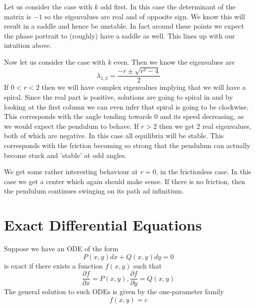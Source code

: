 Let us consider the case with $k$ odd first. In this case the determinant of the matrix is $-1$ so the eigenvalues are real and of opposite sign. We know this will result in a saddle and hence be unstable. In fact around these points we expect the phase portrait to (roughly) have a saddle as well. This lines up with our intuition above.

Now let us consider the case with $k$ even. Then we know the eigenvalues are
$$ \lambda_{1, 2} = \frac{-r \pm \sqrt{r^2 - 4}}{2} $$
If $0 < r < 2$ then we will have complex eigenvalues implying that we will have a spiral. Since the real part is positive, solutions are going to spiral in and by looking at the first column we can even infer that spiral is going to be clockwise. This corresponds with the angle tending towards 0 and its speed decreasing, as we would expect the pendulum to behave. If $r > 2$ then we get 2 real eigenvalues, both of which are negative. In this case all equilibria will be stable. This corresponds with the friction becoming so strong that the pendulum can actually become stuck and 'stable' at odd angles. 

We get some rather interesting behaviour at $r = 0$, in the frictionless case. In this case we get a center which again should make sense. If there is no friction, then the pendulum continues swinging on its path ad infinitium. 

\section{Exact Differential Equations}\label{sec:exact-diff-eq}
Suppose we have an ODE of the form
$$ P(x, y)dx + Q(x, y)dy = 0 $$
is exact if there exists a function $f(x, y)$ such that
$$ \frac{\partial f}{\partial x} = P(x, y), \frac{\partial f}{\partial y} = Q(x, y) $$
The general solution to such ODEs is given by the one-parameter family
$$ f(x, y) = c $$

